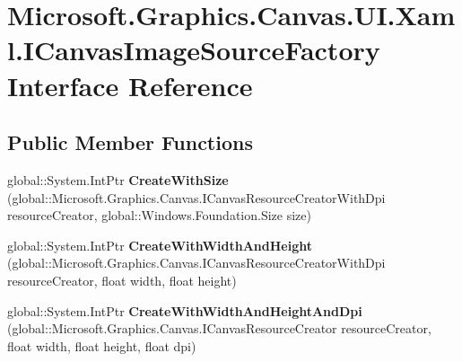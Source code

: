 \hypertarget{interface_microsoft_1_1_graphics_1_1_canvas_1_1_u_i_1_1_xaml_1_1_i_canvas_image_source_factory}{}\section{Microsoft.\+Graphics.\+Canvas.\+U\+I.\+Xaml.\+I\+Canvas\+Image\+Source\+Factory Interface Reference}
\label{interface_microsoft_1_1_graphics_1_1_canvas_1_1_u_i_1_1_xaml_1_1_i_canvas_image_source_factory}
\subsection*{Public Member Functions}
\begin{DoxyCompactItemize}
\item 
\mbox{\label{interface_microsoft_1_1_graphics_1_1_canvas_1_1_u_i_1_1_xaml_1_1_i_canvas_image_source_factory_a4baedcf33415e7e6999fbfaef3bbfbcf}} 
global\+::\+System.\+Int\+Ptr {\bfseries Create\+With\+Size} (global\+::\+Microsoft.\+Graphics.\+Canvas.\+I\+Canvas\+Resource\+Creator\+With\+Dpi resource\+Creator, global\+::\+Windows.\+Foundation.\+Size size)
\item 
\mbox{\label{interface_microsoft_1_1_graphics_1_1_canvas_1_1_u_i_1_1_xaml_1_1_i_canvas_image_source_factory_a10963349bb9cd2efbf8a9fd0e452503b}} 
global\+::\+System.\+Int\+Ptr {\bfseries Create\+With\+Width\+And\+Height} (global\+::\+Microsoft.\+Graphics.\+Canvas.\+I\+Canvas\+Resource\+Creator\+With\+Dpi resource\+Creator, float width, float height)
\item 
\mbox{\label{interface_microsoft_1_1_graphics_1_1_canvas_1_1_u_i_1_1_xaml_1_1_i_canvas_image_source_factory_a6cfd3bc04a35df5bd6c867d8ded122c0}} 
global\+::\+System.\+Int\+Ptr {\bfseries Create\+With\+Width\+And\+Height\+And\+Dpi} (global\+::\+Microsoft.\+Graphics.\+Canvas.\+I\+Canvas\+Resource\+Creator resource\+Creator, float width, float height, float dpi)
\item 
\mbox{\label{interface_microsoft_1_1_graphics_1_1_canvas_1_1_u_i_1_1_xaml_1_1_i_canvas_image_source_factory_a7f81e40660e111a979eb5fc6d370cce8}} 

\end{DoxyCompactItemize}
